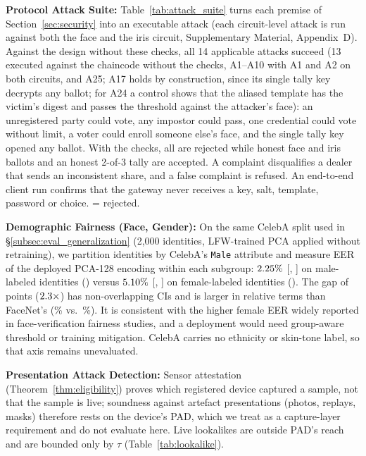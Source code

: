 \documentclass[10pt,letterpaper,journal]{IEEEtran}
\newcommand{\cmark}{\textcolor{green!60!black}{\ding{51}}}   %
\begin{document}
\textbf{Protocol Attack Suite:} Table~\ref{tab:attack_suite} turns each premise of Section~\ref{sec:security} into an executable attack (each circuit-level attack is run against both the face and the iris circuit, Supplementary Material, Appendix~D). Against the design without these checks, all 14 applicable attacks succeed (13 executed against the chaincode without the checks, A1--A10 with A1 and A2 on both circuits, and A25; A17 holds by construction, since its single tally key decrypts any ballot; for A24 a control shows that the aliased template has the victim's digest and passes the threshold against the attacker's face): an unregistered party could vote, any impostor could pass, one credential could vote without limit, a voter could enroll someone else's face, and the single tally key opened any ballot. With the checks, all \nAttacks{} are rejected while honest face and iris ballots and an honest 2-of-3 tally are accepted. A complaint disqualifies a dealer that sends an inconsistent share, and a false complaint is refused. An end-to-end client run confirms that the gateway never receives a key, salt, template, password or choice. \cmark{} = rejected.

\textbf{Demographic Fairness (Face, Gender):} On the same CelebA split used in \S\ref{subsec:eval_generalization} (2,000 identities, LFW-trained PCA applied without retraining), we partition identities by CelebA's \texttt{Male} attribute and measure EER of the deployed PCA-128 encoding within each subgroup: $2.25\%$ [\nMaleEerLo, \nMaleEerHi] on male-labeled identities (\nMaleIds) versus $5.10\%$ [\nFemaleEerLo, \nFemaleEerHi] on female-labeled identities (\nFemaleIds). The gap of \nGenderGap{} points ($2.3\times$) has non-overlapping CIs and is larger in relative terms than FaceNet's (\nFacenetMaleEer\% vs.\ \nFacenetFemaleEer\%). It is consistent with the higher female EER widely reported in face-verification fairness studies, and a deployment would need group-aware threshold or training mitigation. CelebA carries no ethnicity or skin-tone label, so that axis remains unevaluated.

\textbf{Presentation Attack Detection:} Sensor attestation (Theorem~\ref{thm:eligibility}) proves which registered device captured a sample, not that the sample is live; soundness against artefact presentations (photos, replays, masks) therefore rests on the device's PAD, which we treat as a capture-layer requirement and do not evaluate here. Live lookalikes are outside PAD's reach and are bounded only by $\tau$ (Table~\ref{tab:lookalike}).
\end{document}
